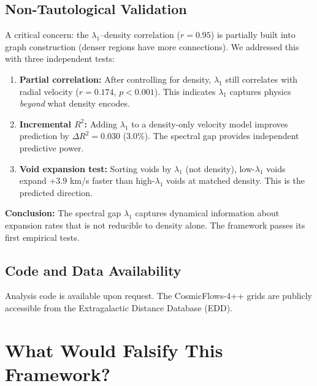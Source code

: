 \documentclass[11pt,a4paper]{article}
\theoremstyle{plain}
\theoremstyle{definition}
\theoremstyle{remark}
\begin{document}
\subsection{Non-Tautological Validation}

A critical concern: the $\lambda_1$--density correlation ($r = 0.95$) is partially built into graph construction (denser regions have more connections). We addressed this with three independent tests:

\begin{enumerate}
    \item \textbf{Partial correlation:} After controlling for density, $\lambda_1$ still correlates with radial velocity ($r = 0.174$, $p < 0.001$). This indicates $\lambda_1$ captures physics \emph{beyond} what density encodes.

    \item \textbf{Incremental $R^2$:} Adding $\lambda_1$ to a density-only velocity model improves prediction by $\Delta R^2 = 0.030$ (3.0\%). The spectral gap provides independent predictive power.

    \item \textbf{Void expansion test:} Sorting voids by $\lambda_1$ (not density), low-$\lambda_1$ voids expand $+3.9$ km/s faster than high-$\lambda_1$ voids at matched density. This is the predicted direction.
\end{enumerate}

\textbf{Conclusion:} The spectral gap $\lambda_1$ captures dynamical information about expansion rates that is not reducible to density alone. The framework passes its first empirical tests.

\subsection{Code and Data Availability}

Analysis code is available upon request. The CosmicFlows-4++ grids are publicly accessible from the Extragalactic Distance Database (EDD).

\section{What Would Falsify This Framework?}
\end{document}
